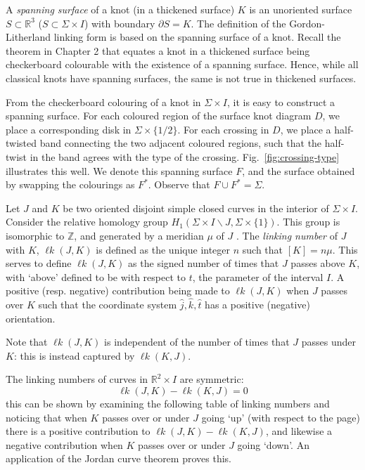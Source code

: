 \documentclass[12pt]{report}
\newcommand{\R}{\mathbb{R}}
\newcommand{\Z}{\mathbb{Z}}
\newcommand{\lk}{\operatorname{\ell\textit{k}}}
\theoremstyle{upright}
\begin{document}
A \textit{spanning surface} of a knot (in a thickened surface) $K$ is an unoriented surface $S \subset \R^{3}$ ($S \subset \Sigma \times I$) with boundary $\partial S = K$. The definition of the Gordon-Litherland linking form is based on the spanning surface of a knot. Recall the theorem in Chapter 2 that equates a knot in a thickened surface being checkerboard colourable with the existence of a spanning surface. Hence, while all classical knots have spanning surfaces, the same is not true in thickened surfaces.

From the checkerboard colouring of a knot in $\Sigma \times I$, it is easy to construct a spanning surface. For each coloured region of the surface knot diagram $D$, we place a corresponding disk in $\Sigma \times \{1/2\}$. For each crossing in $D$, we place a half-twisted band connecting the two adjacent coloured regions, such that the half-twist in the band agrees with the type of the crossing. Fig.~\ref{fig:crossing-type} illustrates this well. We denote this spanning surface $F$, and the surface obtained by swapping the colourings as $F^{*}$. Observe that $F \cup F^{*} = \Sigma$.

Let $J$ and $K$ be two oriented disjoint simple closed curves in the interior of $\Sigma \times I$. Consider the relative homology group $H_{1}(\Sigma \times I \smallsetminus J, \Sigma \times \{1\})$. This group is isomorphic to $\Z$, and generated by a meridian $\mu$ of $J$ \cite{virtual-knot-groups-almost-classical-knots}. The \textit{linking number} of $J$ with $K$, $\lk(J, K)$ is defined as the unique integer $n$ such that $[K] = n\mu$. This serves to define $\lk(J, K)$ as the signed number of times that $J$ passes above $K$, with `above' defined to be with respect to $t$, the parameter of the interval $I$. A positive (resp. negative) contribution being made to $\lk(J, K)$ when $J$ passes over $K$ such that the coordinate system $\hat{j}, \hat{k}, \hat{t}$ has a positive (negative) orientation.

Note that $\lk(J, K)$ is independent of the number of times that $J$ passes under $K$: this is instead captured by $\lk(K, J)$.

The linking numbers of curves in $\R^{2} \times I$ are symmetric:
\[\lk(J, K) - \lk(K, J) = 0\]
this can be shown by examining the following table of linking numbers and noticing that when $K$ passes over or under $J$ going `up' (with respect to the page) there is a positive contribution to $\lk(J, K) - \lk(K, J)$, and likewise a negative contribution when $K$ passes over or under $J$ going `down'. An application of the Jordan curve theorem proves this.
\end{document}
